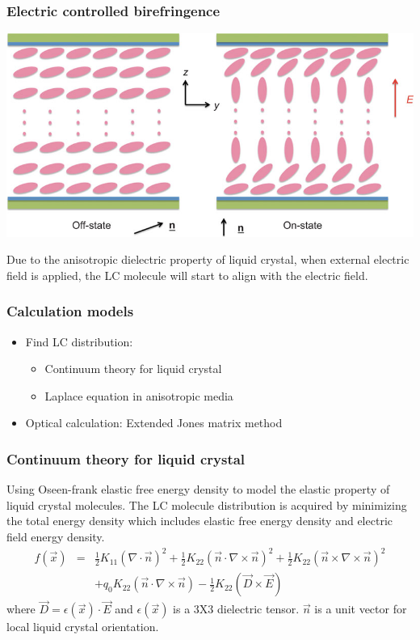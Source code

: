\documentclass{beamer}
\begin{document}
\begin{frame}
\frametitle{Electric controlled birefringence}
\begin{center}
\includegraphics[scale=0.4]{ECB.jpg}
\end{center}
Due to the anisotropic dielectric property of liquid crystal, when external electric field is applied, the LC molecule will start to align with the electric field.
\end{frame}
\begin{frame}
\frametitle{Calculation models}
\begin{itemize}
\item<1-> Find LC distribution:
\begin{itemize}
\item<1-> Continuum theory for liquid crystal
\item<1-> Laplace equation in anisotropic media
\end{itemize}
\item<1-> Optical calculation: Extended Jones matrix method
\end{itemize}
\end{frame}
\begin{frame}
\frametitle{Continuum theory for liquid crystal}
Using Oseen-frank elastic free energy density to model the elastic property of liquid crystal molecules.
The LC molecule distribution is acquired by minimizing the total energy density which includes elastic free energy density and electric field energy density.
\begin{eqnarray}
f(\vec x) &=& \frac{1}{2}K_{11}(\nabla\cdot\vec n)^2+\frac{1}{2}K_{22}(\vec n\cdot\nabla\times\vec n)^2 + \frac{1}{2}K_{22}(\vec n\times\nabla\times\vec n)^2\nonumber \\
&&+q_0K_{22}(\vec n\cdot\nabla\times\vec n) - \frac{1}{2}K_{22}(\vec D\times\vec E)\nonumber
\label{eq:free_energy}
\end{eqnarray}
where $\vec D = \epsilon(\vec x)\cdot \vec E$ and $\epsilon(\vec x)$ is a 3X3 dielectric tensor. $\vec n$ is a unit vector for local liquid crystal orientation.
\end{frame}
\end{document}
